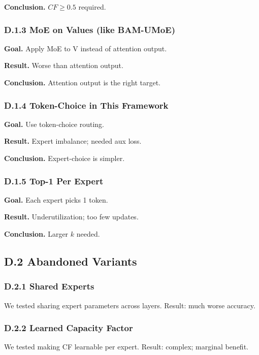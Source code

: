 \textbf{Conclusion.} $CF \geq 0.5$ required.

\subsubsection{D.1.3 MoE on Values (like BAM-UMoE)}

\textbf{Goal.} Apply MoE to V instead of attention output.

\textbf{Result.} Worse than attention output.

\textbf{Conclusion.} Attention output is the right target.

\subsubsection{D.1.4 Token-Choice in This Framework}

\textbf{Goal.} Use token-choice routing.

\textbf{Result.} Expert imbalance; needed aux loss.

\textbf{Conclusion.} Expert-choice is simpler.

\subsubsection{D.1.5 Top-1 Per Expert}

\textbf{Goal.} Each expert picks 1 token.

\textbf{Result.} Underutilization; too few updates.

\textbf{Conclusion.} Larger $k$ needed.

\subsection{D.2 Abandoned Variants}

\subsubsection{D.2.1 Shared Experts}

We tested sharing expert parameters across layers. Result: much worse 
accuracy.

\subsubsection{D.2.2 Learned Capacity Factor}

We tested making CF learnable per expert. Result: complex; marginal 
benefit.

